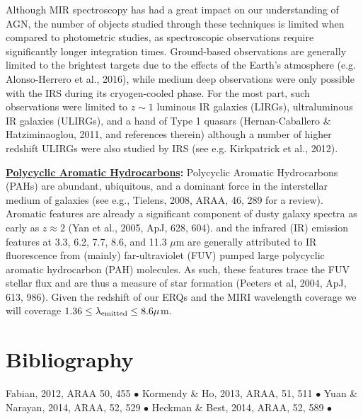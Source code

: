 \smallskip
\smallskip
\noindent
Although MIR spectroscopy has had a great impact on our understanding
of AGN, the number of objects studied through these techniques is
limited when compared to photometric studies, as spectroscopic
observations require significantly longer integration
times. Ground-based observations are generally limited to the
brightest targets due to the effects of the Earth's atmosphere
(e.g. Alonso-Herrero et al., 2016), while medium deep observations were
only possible with the IRS during its cryogen-cooled phase. For the most
part, such observations were limited to $z\sim1$ luminous IR galaxies
(LIRGs), ultraluminous IR galaxies (ULIRGs), and a hand of Type 1 quasars
(Hernan-Caballero \& Hatziminaoglou, 2011, and references therein)
although a number of higher redshift ULIRGs were also studied by IRS
(see e.g. Kirkpatrick et al., 2012). 



\medskip
\medskip
\smallskip
\smallskip
\noindent
{\bf \underline{Polycyclic Aromatic Hydrocarbons}:}
Polycyclic Aromatic Hydrocarbons (PAHs) are abundant, ubiquitous, and
a dominant force in the interstellar medium of galaxies (see e.g.,
Tielens, 2008, ARAA, 46, 289 for a review).  Aromatic features are
already a significant component of dusty galaxy spectra as early as
$z\approx2$ (Yan et al., 2005, ApJ, 628, 604).  and the infrared (IR)
emission features at 3.3, 6.2, 7.7, 8.6, and 11.3 $\mu$m are generally
attributed to IR fluorescence from (mainly) far-ultraviolet (FUV)
pumped large polycyclic aromatic hydrocarbon (PAH) molecules. As such,
these features trace the FUV stellar flux and are thus a measure of
star formation (Peeters et al, 2004, ApJ, 613, 986).
Given the redshift of our ERQs and the MIRI wavelength coverage we will coverage $1.36 \leq \lambda_{\rm emitted} \leq 8.6 \mu$m.




\section{Bibliography}
Fabian, 2012, ARAA 50, 455 $\bullet$ 
Kormendy \& Ho, 2013, ARAA, 51, 511 $\bullet$
Yuan \& Narayan, 2014, ARAA, 52, 529 $\bullet$
Heckman \& Best, 2014, ARAA, 52, 589  $\bullet$



\clearpage


